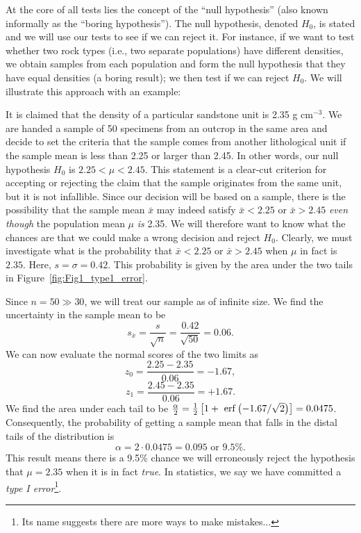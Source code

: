 	At the core of all tests lies the concept of the ``null hypothesis'' (also
known informally as the ``boring hypothesis'').  The null hypothesis,
denoted $H_0$, is stated and we will use our tests to see if we can reject it.  For instance, if 
we want to test whether two rock types (i.e., two separate populations) have different densities, we 
obtain samples from each population and form the null hypothesis 
that they have equal densities (a boring result); we then test if we can reject $H_0$.
We will illustrate this approach with an 
example:
\begin{example}
	It is claimed that the density of a particular sandstone unit is 
2.35 g cm$^{-3}$.  We are handed a sample 
of 50 specimens from an outcrop in the same area and decide to set the criteria that the sample 
comes from another lithological unit if the sample mean is less than 2.25 or larger than 2.45.  In other
words, our null hypothesis $H_0$ is $2.25 < \mu < 2.45$.  This statement is 
a clear-cut criterion for accepting or rejecting the claim that the sample originates from the same unit, 
but it is not infallible.  Since our decision will be based on a sample, there is the possibility that 
the sample mean $\bar{x}$ may indeed satisfy $\bar{x} < 2.25$ or $\bar{x} > 2.45$ \emph{even though} the
population mean $\mu$ \emph{is} 2.35.  We will 
therefore want to know what the chances are that we could make a wrong decision and reject $H_0$.
Clearly, we must investigate what is the probability that $\bar{x} < 2.25$ or $\bar{x} > 2.45$ when $\mu$ in fact is $2.35$.  
Here, $s = \sigma = 0.42$.  This probability is given by the area under the two tails in 
Figure~\ref{fig:Fig1_type1_error}.


Since $n = 50 \gg 30$, we will treat our sample as of infinite size.  We find the uncertainty in the sample mean to be
\begin{equation}
s_{\bar{x}} = \frac{s}{\sqrt{n}} = \frac{0.42}{\sqrt{50}} = 0.06.	 
\end{equation}
We can now evaluate the normal scores of the two limits as
\begin{equation}
z_0 = \frac{2.25 - 2.35}{0.06} = -1.67,
\end{equation}
\begin{equation}
z_1 = \frac{2.45 - 2.35}{0.06} = + 1.67.
\end{equation}
We find the area under each tail to be $\frac{\alpha}{2} = \frac{1}{2} \left[ 1 + \ \operatorname{erf} \left ( -1.67 / \sqrt{2}\right) \right] = 0.0475$.
Consequently, the probability of getting a sample 
mean that falls in the distal tails of the distribution is
\begin{equation}
\alpha = 2 \cdot 0.0475 = 0.095 \mbox{ or } 9.5\%.
\end{equation}	 
This result means there is a 9.5\% chance we will erroneously reject the hypothesis that $\mu = 2.35$ 
when it is in fact \emph{true}.  In statistics, we say we have committed a
\emph{type I error}\footnote{Its name suggests there are more ways to make mistakes...}.
\end{example}

